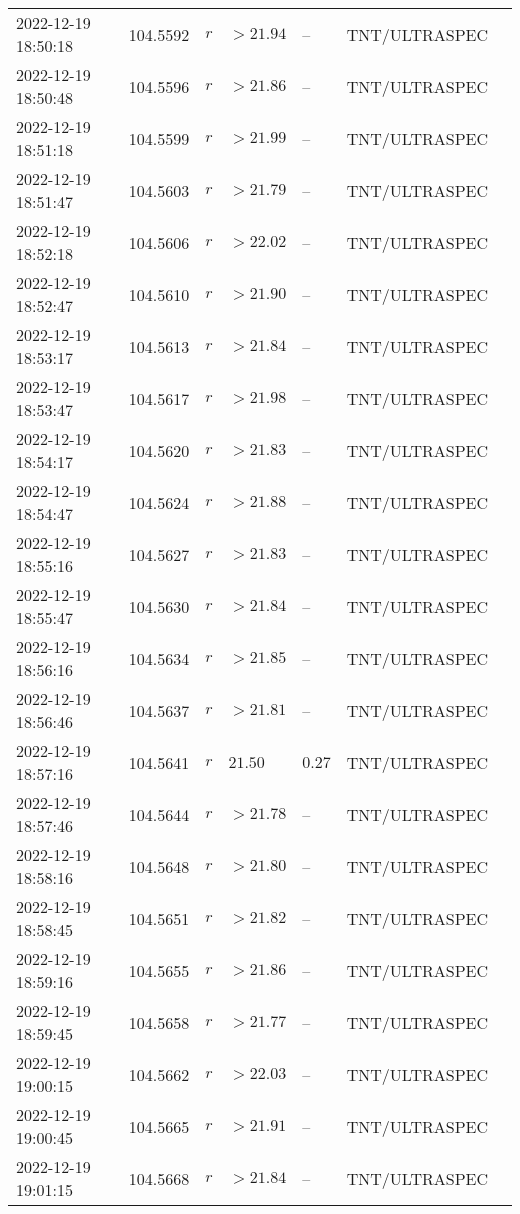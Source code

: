 \documentclass{nature_plusfigure}
\begin{document}
\begin{supplement}
\begin{center}
\begin{longtable}{lllllll}
2022-12-19 18:50:18 & 104.5592 & $r$ & $>21.94$ & -- & TNT/ULTRASPEC &  \\ 
2022-12-19 18:50:48 & 104.5596 & $r$ & $>21.86$ & -- & TNT/ULTRASPEC &  \\ 
2022-12-19 18:51:18 & 104.5599 & $r$ & $>21.99$ & -- & TNT/ULTRASPEC &  \\ 
2022-12-19 18:51:47 & 104.5603 & $r$ & $>21.79$ & -- & TNT/ULTRASPEC &  \\ 
2022-12-19 18:52:18 & 104.5606 & $r$ & $>22.02$ & -- & TNT/ULTRASPEC &  \\ 
2022-12-19 18:52:47 & 104.5610 & $r$ & $>21.90$ & -- & TNT/ULTRASPEC &  \\ 
2022-12-19 18:53:17 & 104.5613 & $r$ & $>21.84$ & -- & TNT/ULTRASPEC &  \\ 
2022-12-19 18:53:47 & 104.5617 & $r$ & $>21.98$ & -- & TNT/ULTRASPEC &  \\ 
2022-12-19 18:54:17 & 104.5620 & $r$ & $>21.83$ & -- & TNT/ULTRASPEC &  \\ 
2022-12-19 18:54:47 & 104.5624 & $r$ & $>21.88$ & -- & TNT/ULTRASPEC &  \\ 
2022-12-19 18:55:16 & 104.5627 & $r$ & $>21.83$ & -- & TNT/ULTRASPEC &  \\ 
2022-12-19 18:55:47 & 104.5630 & $r$ & $>21.84$ & -- & TNT/ULTRASPEC &  \\ 
2022-12-19 18:56:16 & 104.5634 & $r$ & $>21.85$ & -- & TNT/ULTRASPEC &  \\ 
2022-12-19 18:56:46 & 104.5637 & $r$ & $>21.81$ & -- & TNT/ULTRASPEC &  \\ 
2022-12-19 18:57:16 & 104.5641 & $r$ & $21.50$ & $0.27$ & TNT/ULTRASPEC &  \\ 
2022-12-19 18:57:46 & 104.5644 & $r$ & $>21.78$ & -- & TNT/ULTRASPEC &  \\ 
2022-12-19 18:58:16 & 104.5648 & $r$ & $>21.80$ & -- & TNT/ULTRASPEC &  \\ 
2022-12-19 18:58:45 & 104.5651 & $r$ & $>21.82$ & -- & TNT/ULTRASPEC &  \\ 
2022-12-19 18:59:16 & 104.5655 & $r$ & $>21.86$ & -- & TNT/ULTRASPEC &  \\ 
2022-12-19 18:59:45 & 104.5658 & $r$ & $>21.77$ & -- & TNT/ULTRASPEC &  \\ 
2022-12-19 19:00:15 & 104.5662 & $r$ & $>22.03$ & -- & TNT/ULTRASPEC &  \\ 
2022-12-19 19:00:45 & 104.5665 & $r$ & $>21.91$ & -- & TNT/ULTRASPEC &  \\ 
2022-12-19 19:01:15 & 104.5668 & $r$ & $>21.84$ & -- & TNT/ULTRASPEC &  \\ 

\end{longtable}
\end{center}
\end{supplement}
\end{document}
